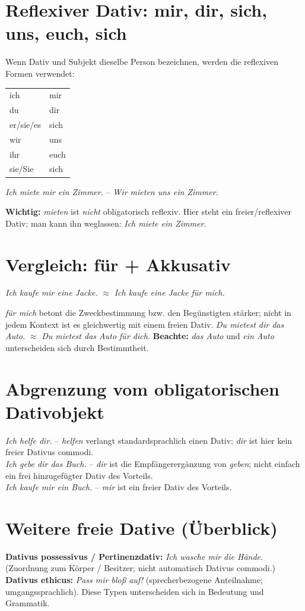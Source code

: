 \documentclass[a4paper,11pt]{article}
\begin{document}
\section{Reflexiver Dativ: mir, dir, sich, uns, euch, sich}
Wenn Dativ und Subjekt dieselbe Person bezeichnen, werden die reflexiven Formen verwendet:
\begin{center}
\begin{tabular}{ll}
ich & mir\\ du & dir\\ er/sie/es & sich\\ wir & uns\\ ihr & euch\\ sie/Sie & sich
\end{tabular}
\end{center}
\textit{Ich miete mir ein Zimmer.} -- \textit{Wir mieten uns ein Zimmer.}

\textbf{Wichtig:} \textit{mieten} ist \emph{nicht} obligatorisch reflexiv. Hier steht ein freier/reflexiver Dativ; man kann ihn weglassen: \textit{Ich miete ein Zimmer.}

\section{Vergleich: für + Akkusativ}
\textit{Ich kaufe mir eine Jacke.} $\approx$ \textit{Ich kaufe eine Jacke für mich.}

\textit{für mich} betont die Zweckbestimmung bzw. den Begünstigten stärker; nicht in jedem Kontext ist es gleichwertig mit einem freien Dativ.
\textit{Du mietest dir das Auto.} $\approx$ \textit{Du mietest das Auto für dich.}
\textbf{Beachte:} \textit{das Auto} und \textit{ein Auto} unterscheiden sich durch Bestimmtheit.

\section{Abgrenzung vom obligatorischen Dativobjekt}
\textit{Ich helfe dir.} -- \textit{helfen} verlangt standardsprachlich einen Dativ; \textit{dir} ist hier kein freier Dativus commodi.\\
\textit{Ich gebe dir das Buch.} -- \textit{dir} ist die Empfängerergänzung von \textit{geben}; nicht einfach ein frei hinzugefügter Dativ des Vorteils.\\
\textit{Ich kaufe mir ein Buch.} -- \textit{mir} ist ein freier Dativ des Vorteils.

\section{Weitere freie Dative (Überblick)}
\textbf{Dativus possessivus / Pertinenzdativ:} \textit{Ich wasche mir die Hände.} (Zuordnung zum Körper / Besitzer; nicht automatisch Dativus commodi.)\\
\textbf{Dativus ethicus:} \textit{Pass mir bloß auf!} (sprecherbezogene Anteilnahme; umgangssprachlich).
Diese Typen unterscheiden sich in Bedeutung und Grammatik.
\end{document}
